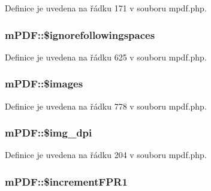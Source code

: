 Definice je uvedena na řádku 171 v souboru mpdf.\-php.

\hypertarget{classm_p_d_f_aa94c2091442d78edc77e1e706187f295}{
\subsubsection[{\$ignorefollowingspaces}]{\setlength{\rightskip}{0pt plus 5cm}m\-P\-D\-F\-::\$ignorefollowingspaces}}\label{classm_p_d_f_aa94c2091442d78edc77e1e706187f295}


Definice je uvedena na řádku 625 v souboru mpdf.\-php.

\hypertarget{classm_p_d_f_a543c6380782deda4105cbdc2abc1794f}{
\subsubsection[{\$images}]{\setlength{\rightskip}{0pt plus 5cm}m\-P\-D\-F\-::\$images}}\label{classm_p_d_f_a543c6380782deda4105cbdc2abc1794f}


Definice je uvedena na řádku 778 v souboru mpdf.\-php.

\hypertarget{classm_p_d_f_ab85189b139766f6ff6571e80397338dd}{
\subsubsection[{\$img\-\_\-dpi}]{\setlength{\rightskip}{0pt plus 5cm}m\-P\-D\-F\-::\$img\-\_\-dpi}}\label{classm_p_d_f_ab85189b139766f6ff6571e80397338dd}


Definice je uvedena na řádku 204 v souboru mpdf.\-php.

\hypertarget{classm_p_d_f_a0a0b660b0e6a258f68868aee4a2af681}{
\subsubsection[{\$increment\-F\-P\-R1}]{\setlength{\rightskip}{0pt plus 5cm}m\-P\-D\-F\-::\$increment\-F\-P\-R1}}\label{classm_p_d_f_a0a0b660b0e6a258f68868aee4a2af681}


